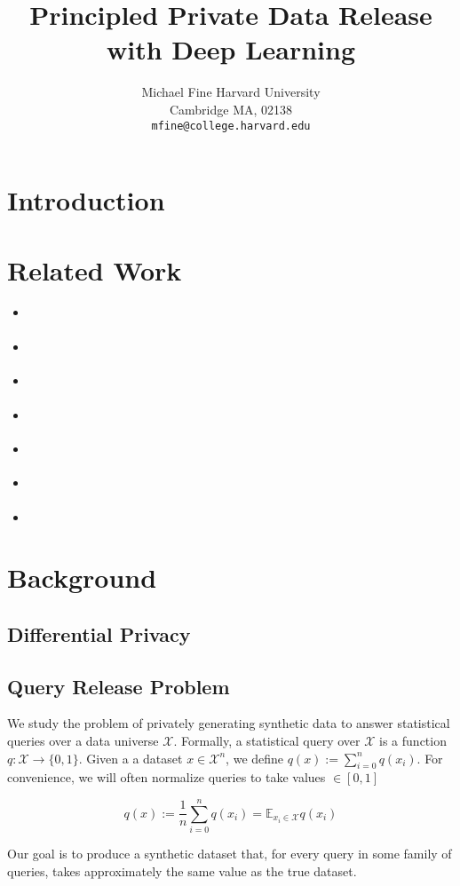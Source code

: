 \documentclass[]{article}
\author{%
  Michael Fine
  Harvard University\\
  Cambridge MA, 02138 \\
  \texttt{mfine@college.harvard.edu} 
}
\title{Principled Private Data Release with Deep Learning}
\newcommand{\X}{\mathcal{X}}
\newcommand{\B}{\{0,1\}}
\newcommand{\E}{\mathbb{E}}
\theoremstyle{definition}
\begin{document}
\maketitle
\setcounter{tocdepth}{2}
\tableofcontents

\section{Introduction}

\section{Related Work}
\begin{itemize}
    \item \cite{JY19}
    \item \cite{GLL+17}
    \item \cite{NRVW19}
    \item \cite{AGH18}
    \item \cite{NRW18}
    \item \cite{GAH+14}
    \item \cite{HLM12}
\end{itemize}
\section{Background}
\subsection{Differential Privacy}
\subsection{Query Release Problem}

We study the problem of privately generating synthetic data to answer statistical queries over a data universe $\X$. Formally, a statistical query over $\X$ is a function $q: \X \to \B$. Given a a dataset $x \in \X^n$, we define $q(x) := \sum_{i=0}^n q(x_i)$. For convenience, we will often normalize queries to take values $\in [0,1]$

\begin{equation}
    q(x) := \frac{1}{n}\sum_{i=0}^n q(x_i) = \E_{x_i \in \X} q(x_i)
\end{equation}

Our goal is to produce a synthetic dataset that, for every query in some family of queries, takes approximately the same value as the true dataset.
\end{document}
